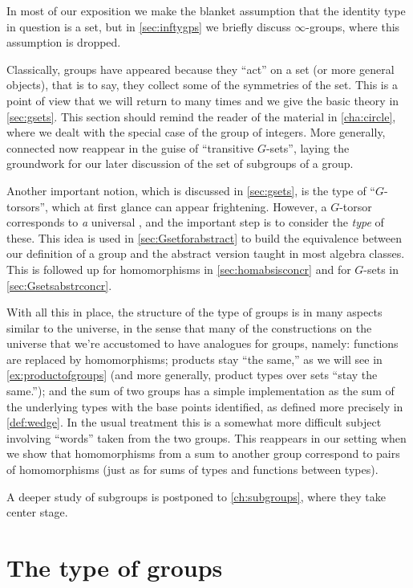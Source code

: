 In most of our exposition we make the blanket assumption that the identity type in question is a set, but in \cref{sec:inftygps} we briefly discuss $\infty$-groups, where this assumption is dropped.

Classically, groups have appeared because they ``act'' on a set (or more general objects), that is to say, they collect some of the symmetries of the set.  This is a point of view that we will return to many times and we give the basic theory in \cref{sec:gsets}.
This section should remind the reader of the material in \cref{cha:circle}, where we dealt with the special case of the group of integers.
More generally, connected \coverings now reappear in the guise of ``transitive $G$-sets'', laying the groundwork for our later discussion of the set of subgroups of a group.

Another important notion, which is discussed in \cref{sec:gsets}, is the type of ``$G$-torsors'', which at first glance can appear frightening.
However, a $G$-torsor corresponds to \emph{a} universal \covering, and the important step is to consider the \emph{type} of these.
This idea is used in \cref{sec:Gsetforabstract} to build the equivalence between our definition of a group and the abstract version taught in most algebra classes.  This is followed up for homomorphisms in \cref{sec:homabsisconcr} and for $G$-sets in \cref{sec:Gsetsabstrconcr}.

With all this in place, the structure of the type of groups is in many aspects similar to the universe, in the sense that many of the constructions on the universe that we're accustomed to have analogues for groups, namely:
functions are replaced by homomorphisms;
products stay ``the same,'' as we will see in \cref{ex:productofgroups}
(and more generally, product types over sets ``stay the same.'');
and the sum of two groups has a simple implementation as the sum of the underlying types with the base points identified, as defined more precisely in \cref{def:wedge}.
In the usual treatment this is a somewhat more difficult subject involving ``words'' taken from the two groups.
This reappears in our setting when we show that homomorphisms
from a sum to another group
correspond to pairs of homomorphisms
(just as for sums of types and functions between types).

A deeper study of subgroups is postponed to \cref{ch:subgroups},
where they take center stage.

\section{The type of groups}
\label{sec:typegroup}

